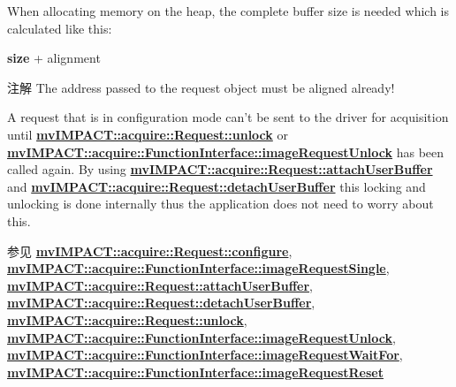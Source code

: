 When allocating memory on the heap, the complete buffer size is needed which is calculated like this\+:

{\bfseries size} + alignment

\begin{DoxyNote}{注解}
The address passed to the request object must be aligned already!

A request that is in configuration mode can't be sent to the driver for acquisition until {\bfseries \hyperlink{classmv_i_m_p_a_c_t_1_1acquire_1_1_request_a3c30ced407d20caef49e3148257cd91e}{mv\+I\+M\+P\+A\+C\+T\+::acquire\+::\+Request\+::unlock}} or {\bfseries \hyperlink{classmv_i_m_p_a_c_t_1_1acquire_1_1_function_interface_a378a338217d5a681e880a0d9395f1a62}{mv\+I\+M\+P\+A\+C\+T\+::acquire\+::\+Function\+Interface\+::image\+Request\+Unlock}} has been called again. By using {\bfseries \hyperlink{classmv_i_m_p_a_c_t_1_1acquire_1_1_request_acd8f58a136dafcb2bae251da383e2b18}{mv\+I\+M\+P\+A\+C\+T\+::acquire\+::\+Request\+::attach\+User\+Buffer}} and {\bfseries \hyperlink{classmv_i_m_p_a_c_t_1_1acquire_1_1_request_a154f54b267a1d9860d1206b2138ef8d0}{mv\+I\+M\+P\+A\+C\+T\+::acquire\+::\+Request\+::detach\+User\+Buffer}} this locking and unlocking is done internally thus the application does not need to worry about this.
\end{DoxyNote}
\begin{DoxySeeAlso}{参见}
{\bfseries \hyperlink{classmv_i_m_p_a_c_t_1_1acquire_1_1_request_a5ad02aed16acd60699f3d8757c63af43}{mv\+I\+M\+P\+A\+C\+T\+::acquire\+::\+Request\+::configure}}, ~\newline
 {\bfseries \hyperlink{classmv_i_m_p_a_c_t_1_1acquire_1_1_function_interface_a59571120b5e81c3af596ea5da5dc63ba}{mv\+I\+M\+P\+A\+C\+T\+::acquire\+::\+Function\+Interface\+::image\+Request\+Single}}, ~\newline
 {\bfseries \hyperlink{classmv_i_m_p_a_c_t_1_1acquire_1_1_request_acd8f58a136dafcb2bae251da383e2b18}{mv\+I\+M\+P\+A\+C\+T\+::acquire\+::\+Request\+::attach\+User\+Buffer}}, ~\newline
 {\bfseries \hyperlink{classmv_i_m_p_a_c_t_1_1acquire_1_1_request_a154f54b267a1d9860d1206b2138ef8d0}{mv\+I\+M\+P\+A\+C\+T\+::acquire\+::\+Request\+::detach\+User\+Buffer}}, ~\newline
 {\bfseries \hyperlink{classmv_i_m_p_a_c_t_1_1acquire_1_1_request_a3c30ced407d20caef49e3148257cd91e}{mv\+I\+M\+P\+A\+C\+T\+::acquire\+::\+Request\+::unlock}}, ~\newline
 {\bfseries \hyperlink{classmv_i_m_p_a_c_t_1_1acquire_1_1_function_interface_a378a338217d5a681e880a0d9395f1a62}{mv\+I\+M\+P\+A\+C\+T\+::acquire\+::\+Function\+Interface\+::image\+Request\+Unlock}}, ~\newline
 {\bfseries \hyperlink{classmv_i_m_p_a_c_t_1_1acquire_1_1_function_interface_a4cefdfda8e8940736ae9a4c97b6de8c9}{mv\+I\+M\+P\+A\+C\+T\+::acquire\+::\+Function\+Interface\+::image\+Request\+Wait\+For}}, ~\newline
 {\bfseries \hyperlink{classmv_i_m_p_a_c_t_1_1acquire_1_1_function_interface_a234b2c6e31f3e83629501da47095c54f}{mv\+I\+M\+P\+A\+C\+T\+::acquire\+::\+Function\+Interface\+::image\+Request\+Reset}} 
\end{DoxySeeAlso}
